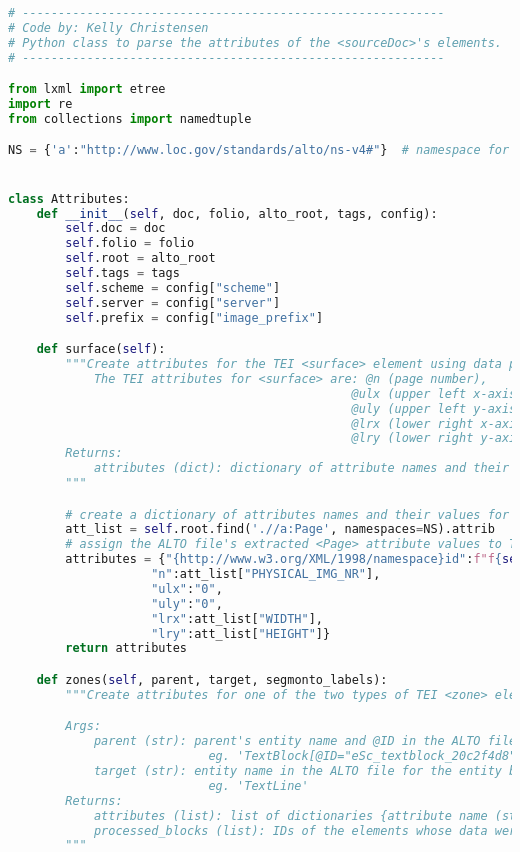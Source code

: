 \documentclass[class=article, crop=false]{standalone}
\begin{document}
\begin{lstlisting}[language=python, style=python]
# -----------------------------------------------------------
# Code by: Kelly Christensen
# Python class to parse the attributes of the <sourceDoc>'s elements.
# -----------------------------------------------------------

from lxml import etree
import re
from collections import namedtuple

NS = {'a':"http://www.loc.gov/standards/alto/ns-v4#"}  # namespace for the Alto xml


class Attributes:
    def __init__(self, doc, folio, alto_root, tags, config):
        self.doc = doc
        self.folio = folio
        self.root = alto_root
        self.tags = tags
        self.scheme = config["scheme"]
        self.server = config["server"]
        self.prefix = config["image_prefix"]

    def surface(self):
        """Create attributes for the TEI <surface> element using data parsed from the ALTO file's <Page> element.
            The TEI attributes for <surface> are: @n (page number), 
                                                @ulx (upper left x-axis pixel position, always 0), 
                                                @uly (upper left y-axis pixel position, always 0), 
                                                @lrx (lower right x-axis pixel position = width of page), 
                                                @lry (lower right y-axis pixel position = length of page)
        Returns:
            attributes (dict): dictionary of attribute names and their values
        """    

        # create a dictionary of attributes names and their values for the ALTO file's <Page> element
        att_list = self.root.find('.//a:Page', namespaces=NS).attrib
        # assign the ALTO file's extracted <Page> attribute values to TEI attribute names
        attributes = {"{http://www.w3.org/XML/1998/namespace}id":f"f{self.folio}",
                    "n":att_list["PHYSICAL_IMG_NR"],
                    "ulx":"0",
                    "uly":"0",
                    "lrx":att_list["WIDTH"],
                    "lry":att_list["HEIGHT"]}
        return attributes

    def zones(self, parent, target, segmonto_labels):
        """Create attributes for one of the two types of TEI <zone> elements: (a) TextBlock and (b) TextLine.

        Args:
            parent (str): parent's entity name and @ID in the ALTO file for the entity being transformed into a <zone>, followed by a '/'
                            eg. 'TextBlock[@ID="eSc_textblock_20c2f4d8"]'
            target (str): entity name in the ALTO file for the entity being transformed into a <zone>
                            eg. 'TextLine'
        Returns:
            attributes (list): list of dictionaries {attribute name (str): value (str)}
            processed_blocks (list): IDs of the elements whose data were extracted
        """        


\end{lstlisting}
\end{document}
